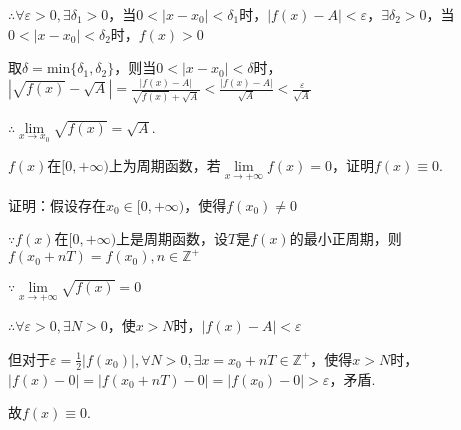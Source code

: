 \documentclass[12pt,UTF8]{ctexart}
\begin{document}
\begin{enumerate}
$\therefore\forall\varepsilon>0,\exists\delta_1>0$，当$0<|x-x_0|<\delta_1$时，$|f(x)-A|<\varepsilon$，$\exists\delta_2>0$，当$0<|x-x_0|<\delta_2$时，$f(x)>0$

取$\delta=\text{min}\{\delta_1,\delta_2\}$，则当$0<|x-x_0|<\delta$时，$|\sqrt{f(x)}-\sqrt A|=\frac{|f(x)-A|}{\sqrt{f(x)}+\sqrt A}<\frac{|f(x)-A|}{\sqrt A}<\frac\varepsilon{\sqrt A}$

$\therefore\lim\limits_{x\rightarrow x_0}\sqrt{f(x)}=\sqrt A$.

$f(x)$在$[0,+\infty)$上为周期函数，若$\lim\limits_{x\rightarrow+\infty}f(x)=0$，证明$f(x)\equiv0$.

证明：假设存在$x_0\in[0,+\infty)$，使得$f(x_0)\neq0$

$\because f(x)$在$[0,+\infty)$上是周期函数，设$T$是$f(x)$的最小正周期，则$f(x_0+nT)=f(x_0),n\in\mathbb Z^+$

$\because\lim\limits_{x\rightarrow+\infty}\sqrt{f(x)}=0$

$\therefore\forall\varepsilon>0,\exists N>0$，使$x>N$时，$|f(x)-A|<\varepsilon$

但对于$\varepsilon=\frac12|f(x_0)|,\forall N>0,\exists x=x_0+nT\in\mathbb Z^+$，使得$x>N$时，$|f(x)-0|=|f(x_0+nT)-0|=|f(x_0)-0|>\varepsilon$，矛盾.

故$f(x)\equiv0$.
\end{enumerate}
\end{document}
